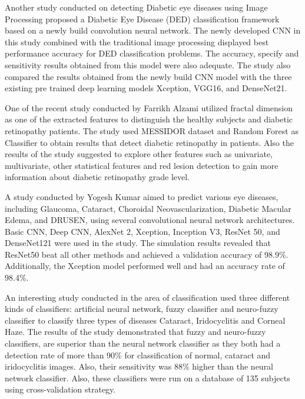 \documentclass[conference]{IEEEtran}
\begin{document}
\vspace{5pt}
Another study conducted on detecting Diabetic eye diseases using Image Processing proposed a Diabetic Eye Disease (DED) classification framework based on a newly build convolution neural network. The newly developed CNN in this study combined with the traditional image processing displayed best performance accuracy for DED classification problems. The accuracy, specify and sensitivity results obtained from this model were also adequate. The study also compared the results obtained from the newly build CNN model with the three existing pre trained deep learning models Xception, VGG16, and DenseNet21.\cite{b9}

\vspace{5pt}
One of the recent study conducted by Farrikh Alzami \cite{b10} utilized fractal dimension as one of the extracted features to distinguish the healthy subjects and diabetic retinopathy patients. The study used MESSIDOR dataset and Random Forest as Classifier to obtain results that detect diabetic retinopathy in patients. Also the results of the study suggested to explore other features such as univariate, multivariate, other statistical features and red lesion detection to gain more information about diabetic retinopathy grade level.

\vspace{5pt}
A study conducted by Yogesh Kumar \cite{b11} aimed to predict various eye diseases, including Glaucoma, Cataract, Choroidal Neovascularization, Diabetic Macular Edema, and DRUSEN, using several convolutional neural network architectures. Basic CNN, Deep CNN, AlexNet 2, Xception, Inception V3, ResNet 50, and DenseNet121 were used in the study. The simulation results revealed that ResNet50 beat all other methods and achieved a validation accuracy of 98.9\%. Additionally, the Xception model performed well and had an accuracy rate of 98.4\%. 

\vspace{5pt}
An interesting study conducted in the area of classification used three different kinds of classifiers: artificial neural network, fuzzy classifier and neuro-fuzzy classifier to classify three types of diseases Cataract, Iridocyclitis and Corneal Haze. The results of the study demonstrated that fuzzy and neuro-fuzzy classifiers, are superior than the neural network classifier as they both had a detection rate of more than 90\% for classification of normal, cataract and iridocyclitis images. Also, their sensitivity was 88\% higher than the neural network classifier. Also, these classifiers were run on a database of 135 subjects using cross-validation strategy.\cite{b12}
\end{document}
